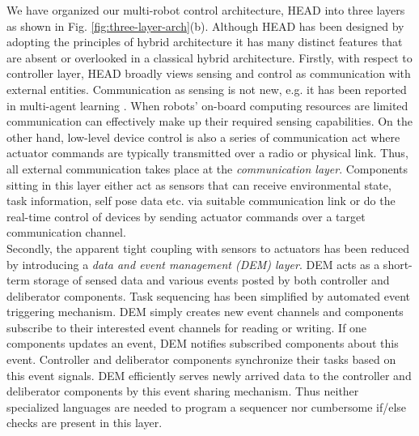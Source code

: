 \documentclass{ifacconf}
\begin{document}
We have organized our  multi-robot control architecture, HEAD into three layers as shown in Fig. \ref{fig:three-layer-arch}(b). Although HEAD has been designed by adopting the principles of hybrid architecture it has many distinct features that are absent or overlooked in a classical hybrid architecture. Firstly, with respect to controller layer, HEAD broadly views sensing and control as communication with external entities. Communication as sensing is not new, e.g. it has been reported in multi-agent learning \citep{Mataric1998}. When robots' on-board computing resources are limited communication can effectively make up their required sensing capabilities. On the other hand, low-level device control is also a series of communication act where actuator commands are typically transmitted over a radio or physical link. Thus, all external communication takes place at the {\em communication layer}. Components sitting in this layer either act as sensors that can receive environmental state, task information, self pose data etc. via suitable communication link or do the real-time control of devices by sending actuator commands over a target communication channel. \\
Secondly, the apparent tight coupling with sensors to actuators has been reduced by introducing a {\em data and event management (DEM) layer}. DEM acts as a short-term storage of sensed data and various events posted by both controller and deliberator components. Task sequencing has been simplified by automated event triggering mechanism. DEM simply creates new event channels and  components subscribe to their interested event channels for reading or writing. If one components updates an event, DEM notifies subscribed components about this event. Controller and deliberator components synchronize their tasks based on this event signals. DEM efficiently serves newly arrived data to the controller and deliberator components by this event sharing mechanism. Thus neither specialized languages are needed to program a sequencer nor cumbersome if/else checks are present in this layer.\\
\end{document}
